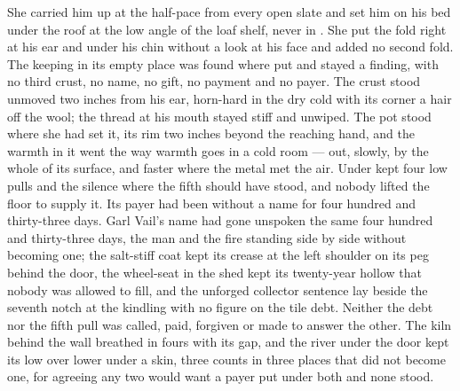 She carried him up  at the half-pace from every open slate and set him on his bed under the roof at the low angle of the loaf shelf, never in . She put the fold right at his ear and under his chin without a look at his face and added no second fold. The keeping in its empty place was found where put and stayed a finding, with no third crust, no name, no gift, no payment and no payer. The crust stood unmoved two inches from his ear, horn-hard in the dry cold with its corner a hair off the wool; the thread at his mouth stayed stiff and unwiped. The pot stood where she had set it, its rim two inches beyond the reaching hand, and the warmth in it went the way warmth goes in a cold room --- out, slowly, by the whole of its surface, and faster where the metal met the air. Under   kept four low pulls and the silence where the fifth should have stood, and nobody lifted the floor to supply it. Its payer had been without a name for four hundred and thirty-three days. Garl Vail's name had gone unspoken the same four hundred and thirty-three days, the man and the fire standing side by side without becoming one; the salt-stiff coat kept its crease at the left shoulder on its peg behind the door, the wheel-seat in the shed kept its twenty-year hollow that nobody was allowed to fill, and the unforged collector sentence lay beside the seventh notch at the kindling with no figure on the tile debt. Neither the debt nor the fifth pull was called, paid, forgiven or made to answer the other. The kiln behind the wall breathed in fours with its gap, and the river under the door kept its low over lower under a skin, three counts in three places that did not become one, for agreeing any two would want a payer put under both and none stood.

\scenebreak


